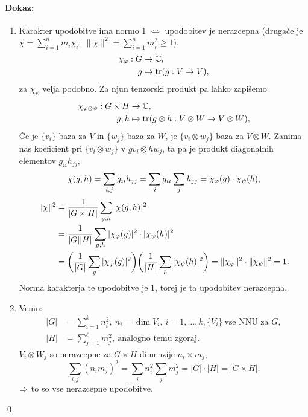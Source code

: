\paragraph{Dokaz:}
\begin{enumerate}
	\item{Karakter upodobitve ima normo 1 $\iff$ upodobitev je nerazcepna (druga\v ce je $\chi = \sum_{i = 1}^n m_i \chi_i;\
		\|\chi\|^2 = \sum_{i = 1}^n m_i^2 \geq 1$).
		\begin{align*}
			\chi_{\varphi} : G &\to \mathbb{C}, \\
			g &\mapsto \operatorname{tr}(g: V \to V),
		\end{align*}
		za $\chi_\psi$ velja podobno. Za njun tenzorski produkt pa lahko zapi\v semo
		\begin{align*}
			\chi_{\varphi \otimes \psi} : G \times H &\to \mathbb{C}, \\
			g, h &\mapsto \operatorname{tr}(g \otimes h : V\otimes W \to V \otimes W),
		\end{align*}
		\v Ce je $\{v_i\}$ baza za $V$ in $\{w_j\}$ baza za $W$, je $\{v_i \otimes w_j\}$ baza za $V \otimes W$. Zanima nas
		koeficient pri $\{v_i \otimes w_j\}$ v $gv_i \otimes h w_j$, ta pa je produkt diagonalnih elementov $g_{ii}h_{jj}$,
		\[
			\chi(g,h) = \sum_{i,j} g_{ii}h_{jj} = \sum_i g_{ii} \sum_j h_{jj} = \chi_{\varphi}(g) \cdot \chi_\psi (h),
		\]
		\begin{align*}
			\|\chi\|^2 &= \frac{1}{|G \times H|}\sum_{g,h}|\chi(g,h)|^2 \\
			&= \frac{1}{|G||H|}\sum_{g, h}|\chi_{\varphi}(g)|^2 \cdot |\chi_\psi(h)|^2 \\
			&= \bigg(\frac{1}{|G|}\sum_g |\chi_{\varphi} (g)|^2\bigg)
				\bigg(\frac{1}{|H|}\sum_h |\chi_\psi(h)|^2\bigg) = \|\chi_{\varphi}\|^2 \cdot \|\chi_\psi\|^2 = 1.
		\end{align*}
		Norma karakterja te upodobitve je $1$, torej je ta upodobitev nerazcepna.}
	\item{Vemo:
		\begin{align*}
			|G| &= \sum_{i = 1}^k n_i^2,\ n_i = \dim V_i,\ i = 1,\ldots,k, \{V_i\}\ \text{vse NNU za $G$}, \\
			|H| &= \sum_{j = 1}^\ell m_j^2,\ \text{analogno temu zgoraj.}
		\end{align*}
		$V_i \otimes W_j$ so nerazcepne za $G \times H$ dimenzije $n_i \times m_j$,
		\[
			\sum_{i,j}(n_i m_j)^2 = \sum_i n_i^2 \sum_j m_j^2 = |G|\cdot|H| = |G \times H|.
		\] $\Rightarrow$ to so vse nerazcepne upodobitve.}
\end{enumerate}
\qed

